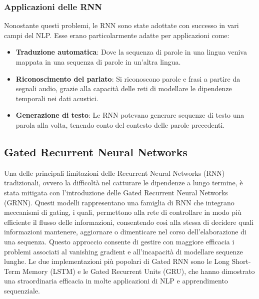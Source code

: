 \subsubsection{Applicazioni delle RNN}
Nonostante questi problemi, le RNN sono state adottate con successo in vari campi del NLP. Esse erano particolarmente adatte per applicazioni come:
\begin{itemize}
	\item \textbf{Traduzione automatica}: Dove la sequenza di parole in una lingua veniva mappata in una sequenza di parole in un'altra lingua.
	\item \textbf{Riconoscimento del parlato}: Si riconoscono parole e frasi a partire da segnali audio, grazie alla capacità delle reti di modellare le dipendenze temporali nei dati acustici.
	\item \textbf{Generazione di testo}: Le RNN potevano generare sequenze di testo una parola alla volta, tenendo conto del contesto delle parole precedenti.
\end{itemize}

\subsection{Gated Recurrent Neural Networks}
Una delle principali limitazioni delle Recurrent Neural Networks (RNN) tradizionali, ovvero la difficoltà nel catturare le dipendenze a lungo termine, è stata mitigata con l'introduzione delle Gated Recurrent Neural Networks (GRNN). Questi modelli rappresentano una famiglia di RNN che integrano meccanismi di gating, i quali, permettono alla rete di controllare in modo più efficiente il flusso delle informazioni, consentendo così alla stessa di decidere quali informazioni mantenere, aggiornare o dimenticare nel corso dell'elaborazione di una sequenza. Questo approccio consente di gestire con maggiore efficacia i problemi associati al vanishing gradient e all'incapacità di modellare sequenze lunghe.
Le due implementazioni più popolari di Gated RNN sono le Long Short-Term Memory (LSTM) e le Gated Recurrent Units (GRU), che hanno dimostrato una straordinaria efficacia in molte applicazioni di NLP e apprendimento sequenziale.

